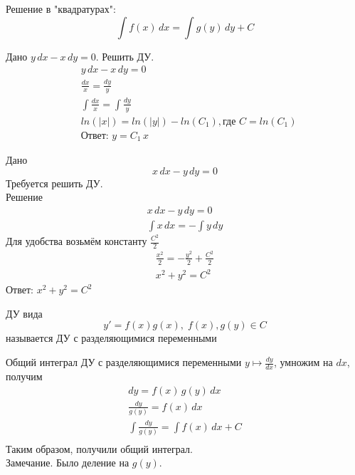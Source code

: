 \begin{Note}
    Решение в "квадратурах":
    \[
        \int f(x)\,dx = \int g(y)\,dy + C
    \]
\end{Note}

\begin{Example}
    Дано $y\,dx - x\,dy = 0$. Решить ДУ.
   \begin{align*}
        &y\,dx - x\,dy = 0 \\
        &\frac{dx}{x} = \frac{dy}{y}\\
        &\int\frac{dx}{x} = \int\frac{dy}{y}\\
        &ln(|x|) = ln(|y|) - ln(C_1), \text{где } C = ln(C_1)\\
        &\text{Ответ: } y = C_1\,x
   \end{align*}
\end{Example}
\begin{Example}
    Дано 
    \[
        x\,dx - y\,dy = 0
    \] 
    Требуется решить ДУ.\\
    Решение
    \begin{gather*}
        x\,dx - y\,dy = 0\\
        \int x\,dx = -\int y\,dy
    \end{gather*}
    Для удобства возьмём константу $\frac{C^2}{2}$
    \begin{gather*}
        \frac{x^2}{2} = -\frac{y^2}{2} + \frac{C^2}{2}\\
        x^2+y^2 = C^2
    \end{gather*}
    Ответ: $x^2+y^2 = C^2$
\end{Example}

\begin{Def}
    ДУ вида 
    \[
        y' = f(x)g(x), \; f(x), g(y) \in C
    \] 
    называется ДУ с разделяющимися переменными
\end{Def}

\begin{Note} 
    Общий интеграл ДУ с разделяющимися переменными $y \mapsto \frac{dy}{dx}$, умножим на $dx$, получим
    \begin{gather*}
        dy = f(x)\,g(y)\,dx\\
        \frac{dy}{g(y)} = f(x)\,dx\\
        \int \frac{dy}{g(y)} = \int f(x)\,dx + C\\
    \end{gather*}
    Таким образом, получили общий интеграл.\\
    
    Замечание. Было деление на $g(y)$.
\end{Note}

